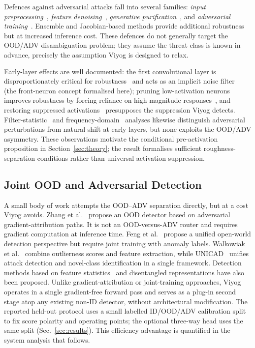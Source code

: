 \documentclass[10pt,letterpaper,journal]{IEEEtran}
\begin{document}
Defences against adversarial attacks fall into several families:
\emph{input preprocessing}~\cite{ziyadinov2023low},
\emph{feature denoising}~\cite{xie2019feature},
\emph{generative purification}~\cite{samangouei2018defense,nie2022diffusion,purify,silva2023diffdefense},
and \emph{adversarial training}~\cite{madry2017towards,zhang2019theoretically}.
Ensemble and Jacobian-based methods
provide additional robustness but at increased inference cost.
These defences do not generally target the OOD/ADV disambiguation problem; they
assume the threat class is known in advance, precisely the assumption
Viyog is designed to relax.

Early-layer effects are well documented: the first convolutional layer is
disproportionately critical for robustness~\cite{bakiskan2022early} and acts as
an implicit noise filter~\cite{FLOD} (the front-neuron concept formalised here);
pruning low-activation neurons improves robustness by forcing reliance on
high-magnitude responses~\cite{dhillon2018stochasticactivationpruningrobust},
and restoring suppressed activations~\cite{10640242} presupposes the suppression
Viyog detects. Filter-statistic~\cite{li2017adversarial} and
frequency-domain~\cite{wang2020high,wang2020towards} analyses likewise
distinguish adversarial perturbations from natural shift at early layers, but
none exploits the OOD/ADV asymmetry. These observations motivate the
conditional pre-activation proposition in Section~\ref{sec:theory}; the result
formalises sufficient roughness-separation conditions rather than universal
activation suppression.

\subsection{Joint OOD and Adversarial Detection}
A small body of work attempts the OOD--ADV separation directly, but at a cost
Viyog avoids.
Zhang et al.~\cite{zhang2025splitting} propose an OOD detector based on
adversarial gradient-attribution paths. It is not an OOD-versus-ADV router and
requires gradient computation at inference time. Feng et
al.~\cite{feng2022unified} propose a unified open-world detection perspective
but require joint training with anomaly labels.
Walkowiak et al.~\cite{walkowiak2023combining} combine outlierness scores and
feature extraction, while UNICAD~\cite{unicad} unifies attack detection and
novel-class identification in a single framework.
Detection methods based on feature statistics~\cite{li2017adversarial}
and disentangled representations have also been proposed.
Unlike gradient-attribution or
joint-training approaches, Viyog operates in a single gradient-free forward
pass and serves as a plug-in second stage atop any existing non-ID detector,
without architectural modification. The reported held-out protocol uses a
small labelled ID/OOD/ADV calibration split to fix score polarity and operating
points; the optional three-way head uses the same split
(Sec.~\ref{sec:results}). This efficiency
advantage is quantified in the system analysis that follows.
\end{document}

